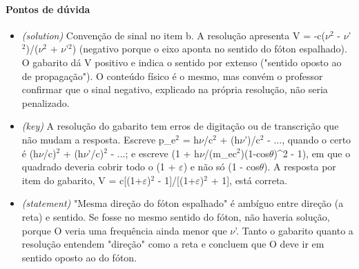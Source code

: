\documentclass{article}%
\begin{document}
\paragraph{Pontos de dúvida}%
\begin{itemize}%
\item%
\textit{(solution)} Convenção de sinal no item b. A resolução apresenta V = -c($\nu$$^2$ - $\nu$'$^2$)/($\nu$$^2$ + $\nu$'$^2$) (negativo porque o eixo aponta no sentido do fóton espalhado). O gabarito dá V positivo e indica o sentido por extenso ("sentido oposto ao de propagação"). O conteúdo físico é o mesmo, mas convém o professor confirmar que o sinal negativo, explicado na própria resolução, não seria penalizado.%
\item%
\textit{(key)} A resolução do gabarito tem erros de digitação ou de transcrição que não mudam a resposta. Escreve p\_e$^2$ = h$\nu$/c$^2$ + (h$\nu$')/c$^2$ - ..., quando o certo é (h$\nu$/c)$^2$ + (h$\nu$'/c)$^2$ - ...; e escreve (1 + h$\nu$/(m\_ec$^2$)(1-cos$\theta$)\^{}2 - 1), em que o quadrado deveria cobrir todo o (1 + $\varepsilon$) e não só (1 - cos$\theta$). A resposta por item do gabarito, V = c{[}(1+$\varepsilon$)$^2$ - 1{]}/{[}(1+$\varepsilon$)$^2$ + 1{]}, está correta.%
\item%
\textit{(statement)} "Mesma direção do fóton espalhado" é ambíguo entre direção (a reta) e sentido. Se fosse no mesmo sentido do fóton, não haveria solução, porque O veria uma frequência ainda menor que $\nu$'. Tanto o gabarito quanto a resolução entendem "direção" como a reta e concluem que O deve ir em sentido oposto ao do fóton.%
\end{itemize}%
\end{document}
